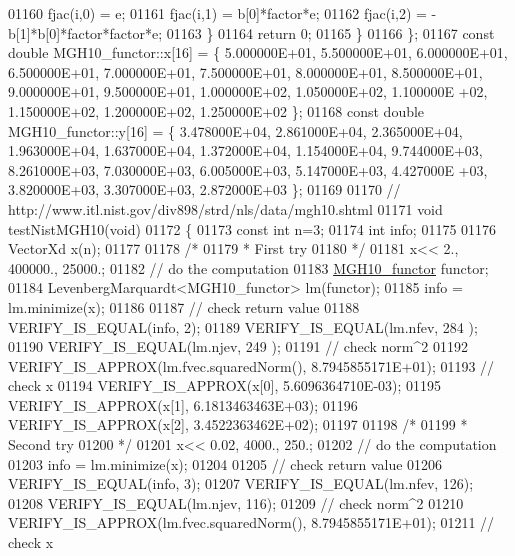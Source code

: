 \begin{DoxyCode}
01160             fjac(i,0) = e;
01161             fjac(i,1) = b[0]*factor*e;
01162             fjac(i,2) = -b[1]*b[0]*factor*factor*e;
01163         \}
01164         \textcolor{keywordflow}{return} 0;
01165     \}
01166 \};
01167 \textcolor{keyword}{const} \textcolor{keywordtype}{double} MGH10\_functor::x[16] = \{ 5.000000E+01, 5.500000E+01, 6.000000E+01, 6.500000E+01, 7.000000E+01,
       7.500000E+01, 8.000000E+01, 8.500000E+01, 9.000000E+01, 9.500000E+01, 1.000000E+02, 1.050000E+02, 1.100000E
      +02, 1.150000E+02, 1.200000E+02, 1.250000E+02 \};
01168 \textcolor{keyword}{const} \textcolor{keywordtype}{double} MGH10\_functor::y[16] = \{ 3.478000E+04, 2.861000E+04, 2.365000E+04, 1.963000E+04, 1.637000E+04,
       1.372000E+04, 1.154000E+04, 9.744000E+03, 8.261000E+03, 7.030000E+03, 6.005000E+03, 5.147000E+03, 4.427000E
      +03, 3.820000E+03, 3.307000E+03, 2.872000E+03 \};
01169 
01170 \textcolor{comment}{// http://www.itl.nist.gov/div898/strd/nls/data/mgh10.shtml}
01171 \textcolor{keywordtype}{void} testNistMGH10(\textcolor{keywordtype}{void})
01172 \{
01173   \textcolor{keyword}{const} \textcolor{keywordtype}{int} n=3;
01174   \textcolor{keywordtype}{int} info;
01175 
01176   VectorXd x(n);
01177 
01178   \textcolor{comment}{/*}
01179 \textcolor{comment}{   * First try}
01180 \textcolor{comment}{   */}
01181   x<< 2., 400000., 25000.;
01182   \textcolor{comment}{// do the computation}
01183   \hyperlink{struct_m_g_h10__functor}{MGH10\_functor} functor;
01184   LevenbergMarquardt<MGH10\_functor> lm(functor);
01185   info = lm.minimize(x);
01186 
01187   \textcolor{comment}{// check return value}
01188   VERIFY\_IS\_EQUAL(info, 2); 
01189   VERIFY\_IS\_EQUAL(lm.nfev, 284 ); 
01190   VERIFY\_IS\_EQUAL(lm.njev, 249 ); 
01191   \textcolor{comment}{// check norm^2}
01192   VERIFY\_IS\_APPROX(lm.fvec.squaredNorm(), 8.7945855171E+01);
01193   \textcolor{comment}{// check x}
01194   VERIFY\_IS\_APPROX(x[0], 5.6096364710E-03);
01195   VERIFY\_IS\_APPROX(x[1], 6.1813463463E+03);
01196   VERIFY\_IS\_APPROX(x[2], 3.4522363462E+02);
01197 
01198   \textcolor{comment}{/*}
01199 \textcolor{comment}{   * Second try}
01200 \textcolor{comment}{   */}
01201   x<< 0.02, 4000., 250.;
01202   \textcolor{comment}{// do the computation}
01203   info = lm.minimize(x);
01204 
01205   \textcolor{comment}{// check return value}
01206   VERIFY\_IS\_EQUAL(info, 3);
01207   VERIFY\_IS\_EQUAL(lm.nfev, 126);
01208   VERIFY\_IS\_EQUAL(lm.njev, 116);
01209   \textcolor{comment}{// check norm^2}
01210   VERIFY\_IS\_APPROX(lm.fvec.squaredNorm(), 8.7945855171E+01);
01211   \textcolor{comment}{// check x}

\end{DoxyCode}
